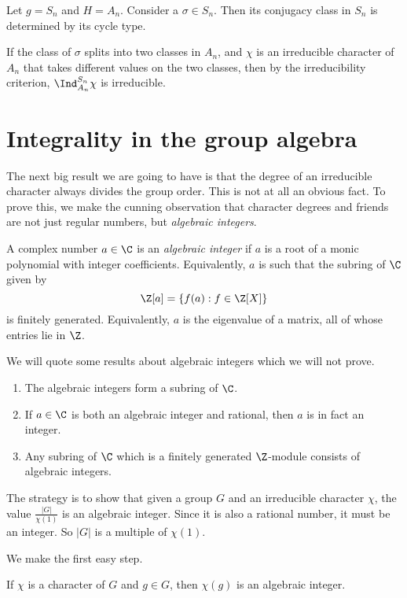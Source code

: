 \documentclass[a4paper]{article}
\begin{document}
\begin{eg}
  Let $g = S_n$ and $H = A_n$. Consider a $\sigma \in S_n$. Then its conjugacy class in $S_n$ is determined by its cycle type.

  If the class of $\sigma$ splits into two classes in $A_n$, and $\chi$ is an irreducible character of $A_n$ that takes different values on the two classes, then by the irreducibility criterion, $\Ind_{A_n}^{S_n} \chi$ is irreducible.
\end{eg}

\section{Integrality in the group algebra}
The next big result we are going to have is that the degree of an irreducible character always divides the group order. This is not at all an obvious fact. To prove this, we make the cunning observation that character degrees and friends are not just regular numbers, but \emph{algebraic integers}.
\begin{defi}
  A complex number $a \in \C$ is an \emph{algebraic integer} if $a$ is a root of a monic polynomial with integer coefficients. Equivalently, $a$ is such that the subring of $\C$ given by
  \[
    \Z[a] = \{f(a): f \in \Z[X]\}
  \]
  is finitely generated. Equivalently, $a$ is the eigenvalue of a matrix, all of whose entries lie in $\Z$.
\end{defi}
We will quote some results about algebraic integers which we will not prove.
\begin{prop}\leavevmode
  \begin{enumerate}
    \item The algebraic integers form a subring of $\C$.
    \item If $a \in \C$ is both an algebraic integer and rational, then $a$ is in fact an integer.
    \item Any subring of $\C$ which is a finitely generated $\Z$-module consists of algebraic integers.
  \end{enumerate}
\end{prop}
The strategy is to show that given a group $G$ and an irreducible character $\chi$, the value $\frac{|G|}{\chi(1)}$ is an algebraic integer. Since it is also a rational number, it must be an integer. So $|G|$ is a multiple of $\chi(1)$.

We make the first easy step.
\begin{prop}
  If $\chi$ is a character of $G$ and $g \in G$, then $\chi(g)$ is an algebraic integer.
\end{prop}
\end{document}
